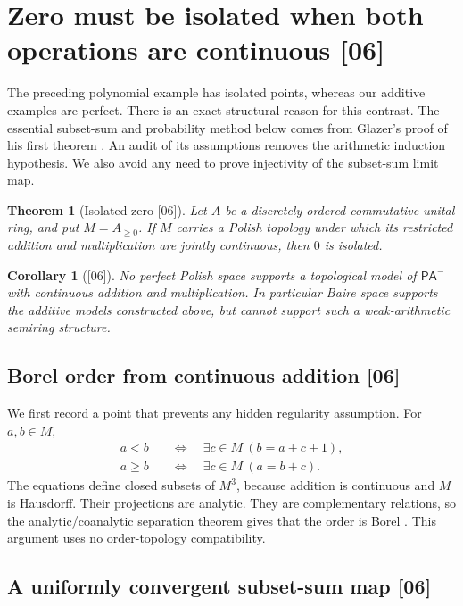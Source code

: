 \documentclass[11pt]{article}
\numberwithin{equation}{section}
\newtheorem{theorem}{Theorem}[section]
\newtheorem{corollary}[corollary]{Corollary}
\theoremstyle{definition}
\theoremstyle{remark}
\newcommand{\src}[1]{\textup{\textsf{\small[#1]}}}
\newcommand{\PAminus}{\mathsf{PA}^{-}}
\begin{document}
\section{Zero must be isolated when both operations are continuous \src{06}}
\label{pma:cp:sec:zero}

The preceding polynomial example has isolated points, whereas our
additive examples are perfect. There is an exact structural reason
for this contrast. The essential subset-sum and probability method
below comes from Glazer's proof of his first theorem \cite{Glazer}.
An audit of its assumptions removes the arithmetic induction
hypothesis. We also avoid any need to prove injectivity of the
subset-sum limit map.

\begin{theorem}[Isolated zero \src{06}]
\label{pma:cp:thm:zero}
Let $A$ be a discretely ordered commutative unital ring, and put
$M=A_{\geq0}$. If $M$ carries a Polish topology under which its
restricted addition and multiplication are jointly continuous, then
$0$ is isolated.
\end{theorem}

\begin{corollary}[\src{06}]
\label{pma:cp:cor:perfect}
No perfect Polish space supports a topological model of $\PAminus$
with continuous addition and multiplication. In particular Baire
space supports the additive models constructed above, but cannot
support such a weak-arithmetic semiring structure.
\end{corollary}

\subsection{Borel order from continuous addition \src{06}}

We first record a point that prevents any hidden regularity assumption.
For $a,b\in M$,
\begin{align*}
 a<b&\quad\Longleftrightarrow\quad
       \exists c\in M\ (b=a+c+1),\\
 a\geq b&\quad\Longleftrightarrow\quad
       \exists c\in M\ (a=b+c).
\end{align*}
The equations define closed subsets of $M^3$, because addition is
continuous and $M$ is Hausdorff. Their projections are analytic.
They are complementary relations, so the analytic/coanalytic
separation theorem gives that the order is Borel \cite{Kechris}. This argument
uses no order-topology compatibility.

\subsection{A uniformly convergent subset-sum map \src{06}}
\end{document}
